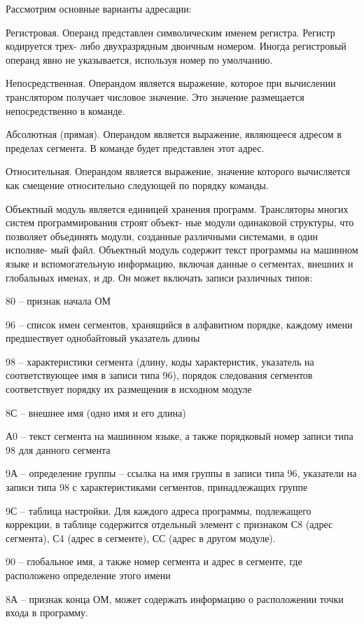 Рассмотрим основные варианты адресации:

Регистровая. Операнд представлен символическим именем регистра. Регистр кодируется трех- либо двухразрядным двоичным номером. Иногда регистровый операнд явно не указывается, используя номер по умолчанию.

Непосредственная. Операндом является выражение, которое при вычислении транслятором получает числовое значение.
Это значение размещается непосредственно в команде.

Абсолютная (прямая). Операндом является выражение, являющееся адресом в пределах сегмента. В команде будет представлен этот адрес.

Относительная. Операндом является выражение, значение которого вычисляется как смещение относительно следующей по порядку команды.

Объектный модуль является единицей хранения программ. Трансляторы многих систем программирования строят объект- ные модули одинаковой структуры, что позволяет объединять модули, созданные различными системами, в один исполняе- мый файл. Объектный модуль содержит текст программы на машинном языке и вспомогательную информацию, включая данные о сегментах, внешних и глобальных именах, и др. Он может включать записи различных типов:

80 – признак начала ОМ

96 – список имен сегментов, хранящийся в алфавитном порядке, каждому имени предшествует однобайтовый указатель длины

98 – характеристики сегмента (длину, коды характеристик, указатель на соответствующее имя в записи типа 96), порядок следования сегментов соответствует порядку их размещения в исходном модуле

8С – внешнее имя (одно имя и его длина)

А0 – текст сегмента на машинном языке, а также порядковый номер записи типа 98 для данного сегмента

9А – определение группы – ссылка на имя группы в записи типа 96, указатели на записи типа 98 с характеристиками сегментов, принадлежащих группе

9С – таблица настройки. Для каждого адреса программы, подлежащего коррекции, в таблице содержится отдельный элемент с признаком С8 (адрес сегмента), С4 (адрес в сегменте), СС (адрес в другом модуле).

90 – глобальное имя, а также номер сегмента и адрес в сегменте, где расположено определение этого имени

8А – признак конца ОМ, может содержать информацию о расположении точки входа в программу.


